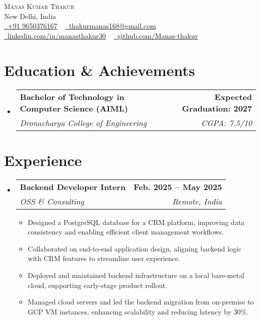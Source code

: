\documentclass[letterpaper,11pt]{article}
\makeatletter
\newcommand{\resumeItem}[1]{
  \item\small{
    {#1 \vspace{-2pt}}
  }
}
\newcommand{\resumeSubheading}[4]{
  \vspace{-2pt}\item
  \begin{tabular*}{1.0\textwidth}[t]{l@{\extracolsep{\fill}}r}
    \textbf{#1} & \textbf{\small #2} \\
    \textit{\small#3} & \textit{\small #4} \\
  \end{tabular*}\vspace{-7pt}
}
\newcommand{\resumeSubHeadingListStart}{\begin{itemize}[leftmargin=0.0in, label={}]}
\newcommand{\resumeSubHeadingListEnd}{\end{itemize}}
\newcommand{\resumeItemListStart}{\begin{itemize}}
\newcommand{\resumeItemListEnd}{\end{itemize}\vspace{-5pt}}
\makeatother
\begin{document}
\begin{center}
    {\Huge \scshape Manas Kumar Thakur} \\ \vspace{3pt}
    New Delhi, India \\ \vspace{3pt}
    \small 
    \href{tel:+919650376167}{\raisebox{-0.1\height}\faPhone\ \underline{+91 9650376167}} ~
    \href{mailto:thakurmanas168@gmail.com}{\raisebox{-0.2\height}\faEnvelope\ \underline{thakurmanas168@gmail.com}} ~
    \href{https://www.linkedin.com/in/manasthakur30}{\raisebox{-0.2\height}\faLinkedin\ \underline{linkedin.com/in/manasthakur30}} ~
    \href{https://github.com/Manas-thakur}{\raisebox{-0.2\height}\faGithub\ \underline{github.com/Manas-thakur}}
    \vspace{-8pt}
\end{center}

\section{Education \& Achievements}
\resumeSubHeadingListStart
  \resumeSubheading
    {Bachelor of Technology in Computer Science (AIML)}{Expected Graduation: 2027}
    {Dronacharya College of Engineering}{CGPA: 7.5/10}
\resumeSubHeadingListEnd

\section{Experience}
\resumeSubHeadingListStart
  \resumeSubheading
    {Backend Developer Intern}{Feb. 2025 -- May 2025}
    {OSS \& Consulting}{Remote, India}
    \resumeItemListStart
      \resumeItem{Designed a PostgreSQL database for a CRM platform, improving data consistency and enabling efficient client management workflows.}
      \resumeItem{Collaborated on end-to-end application design, aligning backend logic with CRM features to streamline user experience.}
      \resumeItem{Deployed and maintained backend infrastructure on a local bare-metal cloud, supporting early-stage product rollout.}
      \resumeItem{Managed cloud servers and led the backend migration from on-premise to GCP VM instances, enhancing scalability and reducing latency by 30\%.}
    \resumeItemListEnd
\resumeSubHeadingListEnd

\end{document}
